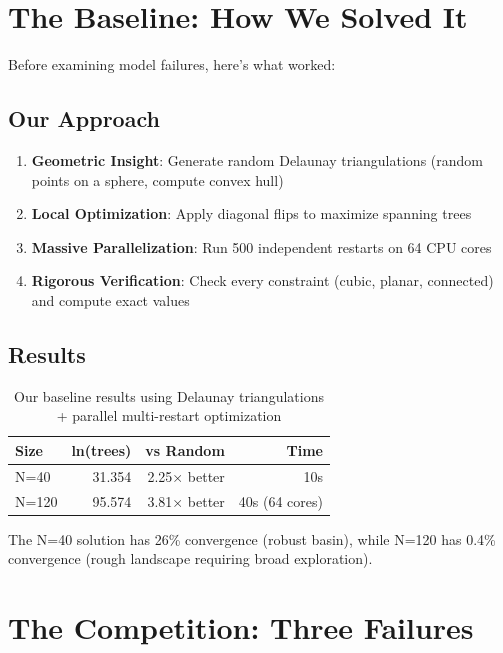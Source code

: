 \documentclass[11pt]{article}
\begin{document}
\section{The Baseline: How We Solved It}

Before examining model failures, here's what worked:

\subsection{Our Approach}

\begin{enumerate}
\item \textbf{Geometric Insight}: Generate random Delaunay triangulations (random points on a sphere, compute convex hull)
\item \textbf{Local Optimization}: Apply diagonal flips to maximize spanning trees
\item \textbf{Massive Parallelization}: Run 500 independent restarts on 64 CPU cores
\item \textbf{Rigorous Verification}: Check every constraint (cubic, planar, connected) and compute exact values
\end{enumerate}

\subsection{Results}

\begin{table}[h]
\centering
\begin{tabular}{lrrr}
\toprule
\textbf{Size} & \textbf{ln(trees)} & \textbf{vs Random} & \textbf{Time} \\
\midrule
N=40 & 31.354 & 2.25× better & 10s \\
N=120 & 95.574 & 3.81× better & 40s (64 cores) \\
\bottomrule
\end{tabular}
\caption{Our baseline results using Delaunay triangulations + parallel multi-restart optimization}
\end{table}

The N=40 solution has 26\% convergence (robust basin), while N=120 has 0.4\% convergence (rough landscape requiring broad exploration).

\section{The Competition: Three Failures}
\end{document}

